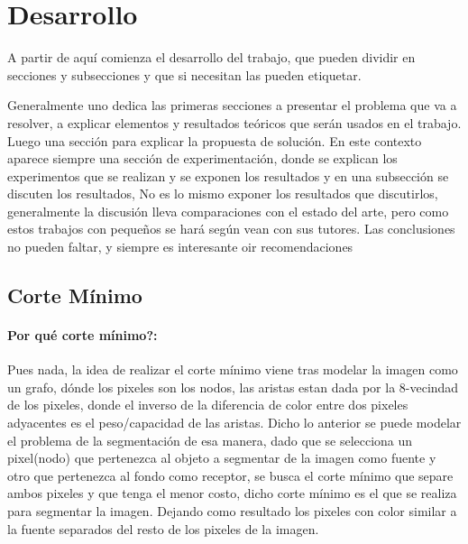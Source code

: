 \documentclass[a4paper,10pt,twocolumn]{article}
\begin{document}



\section{Desarrollo}\label{sec:dev}
A partir de aqu\'{i} comienza el desarrollo del trabajo, que pueden dividir en secciones y subsecciones y que si necesitan las pueden etiquetar.

Generalmente uno dedica las primeras secciones a presentar el problema que va a resolver, a explicar elementos y resultados te\'{o}ricos que ser\'{a}n usados en el trabajo. Luego una secci\'{o}n para explicar la propuesta de soluci\'{o}n.
En este contexto aparece siempre una secci\'{o}n de experimentaci\'{o}n, donde se explican los experimentos que se realizan y se exponen los resultados y en una subsecci\'{o}n se discuten los resultados, No es lo mismo exponer los resultados que discutirlos, generalmente la discusi\'{o}n lleva comparaciones con el estado del arte, pero como estos trabajos con peque\~{n}os se har\'{a} seg\'{u}n  vean con sus tutores.
Las conclusiones no pueden faltar, y siempre es interesante oir recomendaciones
 
 

	\subsection{}\label{}


\subsection{Corte M\'inimo}

\paragraph*{Por qu\'e corte m\'inimo?:}
Pues nada, la idea de realizar el corte m\'inimo viene tras modelar la imagen como un grafo, d\'onde los pixeles son los nodos,
las aristas estan dada por la 8-vecindad de los pixeles, donde el inverso de la diferencia de color
entre dos pixeles adyacentes es el peso/capacidad de las aristas. Dicho lo anterior se puede modelar el problema de la segmentaci\'on de esa manera,
dado que se selecciona un pixel(nodo) que pertenezca al objeto a segmentar de la imagen como fuente y otro que pertenezca al fondo como receptor,
se busca el corte m\'inimo que separe ambos pixeles y que tenga el menor costo, dicho corte m\'inimo es el que se realiza para segmentar la imagen.
Dejando como resultado los pixeles con color similar a la fuente separados del resto de los pixeles de la imagen.
\end{document}
